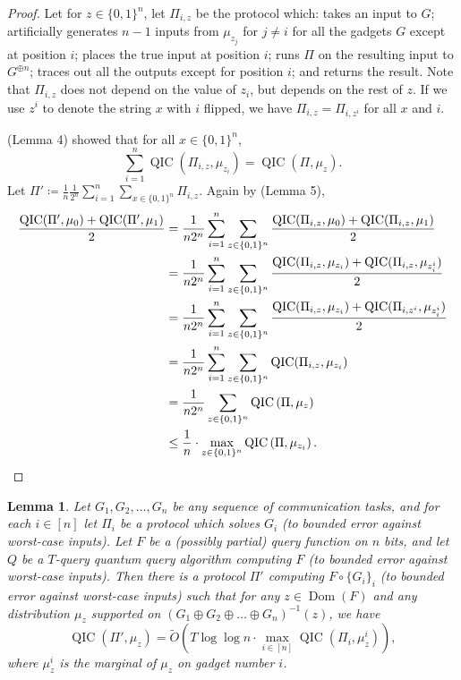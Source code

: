 \documentclass[10pt,a4paper]{article}
\newtheorem{lemma}[theorem]{Lemma}
\theoremstyle{definition}
\newcommand{\tO}{\tilde{O}}
\DeclareMathOperator{\Dom}{Dom}
\newcommand{\B}{\{0,1\}}
\renewcommand{\>}{\rangle}
\newcommand{\<}{\langle}
\DeclareMathOperator{\QIC}{QIC}
\begin{document}
\begin{proof}
Let for $z\in\B^n$, let $\Pi_{i,z}$ be the protocol which:
takes an input to $G$;
artificially generates $n-1$ inputs from $\mu_{z_j}$ for $j\ne i$
for all the gadgets $G$ except at position $i$; places
the true input at position $i$; runs $\Pi$ on the resulting
input to $G^{\oplus n}$; traces out all the outputs except for
position $i$; and returns the result. Note that $\Pi_{i,z}$
does not depend on the value of $z_i$, but depends on the rest of $z$.
If we use $z^i$ to denote the string $x$ with $i$ flipped, we have
$\Pi_{i,z}=\Pi_{i,z^i}$ for all $x$ and $i$.

\cite{Tou15} (Lemma 4) showed that for all $x\in\B^n$,
\[\sum_{i=1}^n\QIC(\Pi_{i,z},\mu_{z_i})
=\QIC\left(\Pi,\mu_{z}\right).\]
Let $\Pi'\coloneqq\frac{1}{n}\frac{1}{2^n}\sum_{i=1}^n\sum_{x\in\B^n}\Pi_{i,z}$.
Again by \cite{Tou15} (Lemma 5),
\begin{align*}
\frac{\QIC(\Pi',\mu_0)+\QIC(\Pi',\mu_1)}{2}
&=\frac{1}{n2^n}\sum_{i=1}^n\sum_{z\in\B^n}
	\frac{\QIC(\Pi_{i,z},\mu_0)+\QIC(\Pi_{i,z},\mu_1)}{2}\\
&=\frac{1}{n2^n}\sum_{i=1}^n\sum_{z\in\B^n}
	\frac{\QIC(\Pi_{i,z},\mu_{z_i})+\QIC(\Pi_{i,z},\mu_{z^i_i})}{2}\\
&=\frac{1}{n2^n}\sum_{i=1}^n\sum_{z\in\B^n}
	\frac{\QIC(\Pi_{i,z},\mu_{z_i})+\QIC(\Pi_{i,z^i},\mu_{z^i_i})}{2}\\
&=\frac{1}{n2^n}\sum_{i=1}^n\sum_{z\in\B^n}\QIC(\Pi_{i,z},\mu_{z_i})\\
&=\frac{1}{n2^n}\sum_{z\in\B^n}\QIC\left(\Pi,\mu_z\right)\\
&\le \frac{1}{n}\cdot\max_{z\in\B^n}\QIC\left(\Pi,\mu_{z_i}\right).\qedhere
\end{align*}
\end{proof}


\begin{lemma}\label{lem:query_QIC}
Let $G_1,G_2,\dots,G_n$ be any sequence of communication tasks,
and for each $i\in[n]$ let $\Pi_i$ be a protocol which
solves $G_i$ (to bounded error against worst-case inputs).
Let $F$ be a (possibly partial) query function on $n$ bits, and let $Q$
be a $T$-query quantum query algorithm computing $F$ (to bounded error
against worst-case inputs).
Then there is a protocol $\Pi'$ computing $F\circ \{G_i\}_i$ (to bounded
error against worst-case inputs)
such that for any $z\in\Dom(F)$ and any distribution $\mu_z$ supported on
$(G_1\oplus G_2\oplus\dots\oplus G_n)^{-1}(z)$, we have
\[\QIC(\Pi',\mu_z)=\tO\left(T\log\log n\cdot \max_{i\in[n]}\QIC(\Pi_i,\mu^i_z)\right),\]
where $\mu^i_z$ is the marginal of $\mu_z$ on gadget number $i$.
\end{lemma}
\end{document}
